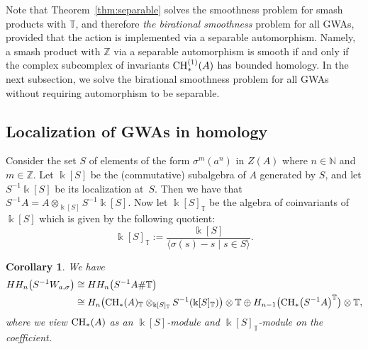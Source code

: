 \documentclass[10pt,a4paper]{amsart}
\newcommand{\B}[1]{\mathbb{#1}}
\newcommand{\CH}{{\rm CH}}
\numberwithin{equation}{section}
\newtheorem{Corollary}[Theorem]{Corollary}
\begin{document}
Note that Theorem~\ref{thm:separable} solves the smoothness problem for smash products with
$\B{T}$, and therefore \emph{the birational smoothness} problem for all GWAs, provided that
the action is implemented via a separable automorphism. Namely, a smash product with
$\B{Z}$ via a separable automorphism is smooth if and only if the complex subcomplex of
invariants $\CH_*^{(1)}(A)$ has bounded homology. In the next subsection, we solve the
birational smoothness problem for all GWAs without requiring automorphism to be separable.

\subsection{Localization of GWAs in homology}\label{sect:localizationGWA}

Consider the set $S$ of elements of the form $\sigma^m(a^n)$ in $Z(A)$ where $n\in\B{N}$ and
$m\in\B{Z}$. Let $\Bbbk[ S]$ be the (commutative) subalgebra of $A$ generated by $S$,
and let $S^{-1}\Bbbk[ S]$ be its localization at~$S$. Then we have that
$S^{-1}A=A\otimes_{\Bbbk[ S]}S^{-1}\Bbbk[ S]$. Now let
$\Bbbk[ S]_{\B{T}}$ be the algebra of coinvariants of~$\Bbbk[ S]$ which is
given by the following quotient:
\[ \Bbbk[ S]_{\B{T}} := \frac{\Bbbk[ S]}{\langle \sigma(s)-s\mid
 s\in S\rangle}. \]

\begin{Corollary} \label{cor:localization}
 We have
 \begin{align*}
 HH_n\bigl(S^{-1}W_{a,\sigma}\bigr)
 \cong{} & HH_n\bigl(S^{-1}A\# \B{T}\bigr)\\
 \cong{} & H_n\bigl(\CH_*(A)_{\B{T}}\otimes_{\Bbbk[ S]_{\B{T}}}S^{-1}(\Bbbk[ S]_{\B{T}})\bigr) \otimes \B{T}
 \oplus H_{n-1}\bigl(\CH_*\bigl(S^{-1}A\bigr)^{\B{T}}\bigr)\otimes \B{T},
 \end{align*}
 where we view $\CH_*(A)$ as an $\Bbbk[ S]$-module and $\Bbbk[ S]_{\B{T}}$-module on the
 coefficient.
\end{Corollary}
\end{document}
